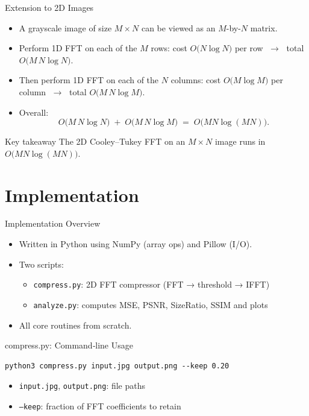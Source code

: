 \documentclass[12pt]{beamer}
\begin{document}
\begin{frame}{Extension to 2D Images}
  \begin{itemize}
    \item A grayscale image of size \(M\times N\) can be viewed as an \(M\)-by-\(N\) matrix.
    \item Perform 1D FFT on each of the \(M\) rows:  
      cost \(O\bigl(N\log N\bigr)\) per row \(\;\to\;\) total \(O\bigl(M\,N\log N\bigr)\).
    \item Then perform 1D FFT on each of the \(N\) columns:  
      cost \(O\bigl(M\log M\bigr)\) per column \(\;\to\;\) total \(O\bigl(M\,N\log M\bigr)\).
    \item Overall:
      \[
        O\bigl(M\,N\log N\bigr) \;+\; O\bigl(M\,N\log M\bigr)
        \;=\;
        O\bigl(MN\log(MN)\bigr).
      \]
  \end{itemize}

  \begin{block}{Key takeaway}
    The 2D Cooley–Tukey FFT on an \(M\times N\) image runs in  
    \(\displaystyle O\bigl(MN\log(MN)\bigr)\).
  \end{block}
\end{frame}





\section{Implementation}

\begin{frame}[fragile]{Implementation Overview}
  \begin{itemize}
    \item Written in Python using NumPy (array ops) and Pillow (I/O).
    \item Two scripts:
      \begin{itemize}
        \item \texttt{compress.py}: 2D FFT compressor (FFT → threshold → IFFT)
        \item \texttt{analyze.py}: computes MSE, PSNR, SizeRatio, SSIM and plots
      \end{itemize}
    \item All core routines from scratch.
  \end{itemize}
  \normalsize
\end{frame}

\begin{frame}[fragile]{compress.py: Command‑line Usage}
  \begin{verbatim}
python3 compress.py input.jpg output.png --keep 0.20
  \end{verbatim}
  \normalsize
  \begin{itemize}
    \item \texttt{input.jpg}, \texttt{output.png}: file paths
    \item \texttt{--keep}: fraction of FFT coefficients to retain
  \end{itemize}
\end{frame}
\end{document}
